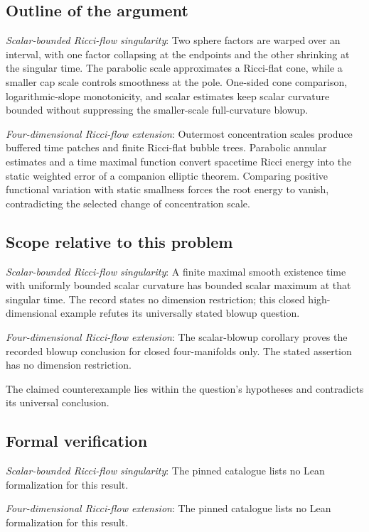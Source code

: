 \documentclass[11pt]{article}
\begin{document}
\subsection{Outline of the argument}
\textit{Scalar-bounded Ricci-flow singularity}: Two sphere factors are warped over an interval, with one factor collapsing at the endpoints and the other shrinking at the singular time. The parabolic scale approximates a Ricci-flat cone, while a smaller cap scale controls smoothness at the pole. One-sided cone comparison, logarithmic-slope monotonicity, and scalar estimates keep scalar curvature bounded without suppressing the smaller-scale full-curvature blowup.

\textit{Four-dimensional Ricci-flow extension}: Outermost concentration scales produce buffered time patches and finite Ricci-flat bubble trees. Parabolic annular estimates and a time maximal function convert spacetime Ricci energy into the static weighted error of a companion elliptic theorem. Comparing positive functional variation with static smallness forces the root energy to vanish, contradicting the selected change of concentration scale.

\subsection{Scope relative to this problem}
\textit{Scalar-bounded Ricci-flow singularity}: A finite maximal smooth existence time with uniformly bounded scalar curvature has bounded scalar maximum at that singular time. The record states no dimension restriction; this closed high-dimensional example refutes its universally stated blowup question.

\textit{Four-dimensional Ricci-flow extension}: The scalar-blowup corollary proves the recorded blowup conclusion for closed four-manifolds only. The stated assertion has no dimension restriction.

The claimed counterexample lies within the question’s hypotheses and contradicts its universal conclusion.

\subsection{Formal verification}
\textit{Scalar-bounded Ricci-flow singularity}: The pinned catalogue lists no Lean formalization for this result.

\textit{Four-dimensional Ricci-flow extension}: The pinned catalogue lists no Lean formalization for this result.
\end{document}

